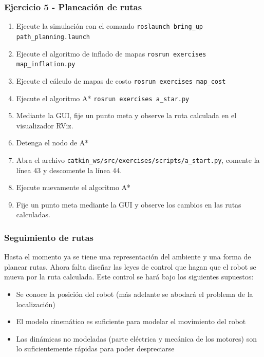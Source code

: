 \begin{frame}[containsverbatim]\frametitle{Ejercicio 5 - Planeación de rutas}
  \begin{enumerate}
  \item Ejecute la simulación con el comando \texttt{roslaunch bring\_up path\_planning.launch}
  \item Ejecute el algoritmo de inflado de mapas \texttt{rosrun exercises map\_inflation.py}
  \item Ejecute el cálculo de mapas de costo \texttt{rosrun exercises map\_cost}
  \item Ejecute el algoritmo A* \texttt{rosrun exercises a\_star.py}
  \item Mediante la GUI, fije un punto meta y observe la ruta calculada en el visualizador RViz.
  \item Detenga el nodo de A*
  \item Abra el archivo \texttt{catkin\_ws/src/exercises/scripts/a\_start.py}, comente la línea 43 y descomente la línea 44.
  \item Ejecute nuevamente el algoritmo A*
  \item Fije un punto meta mediante la GUI y observe los cambios en las rutas calculadas.
  \end{enumerate}
\end{frame}

\begin{frame}\frametitle{Seguimiento de rutas}
  Hasta el momento ya se tiene una representación del ambiente y una forma de planear rutas. Ahora falta diseñar las leyes de control que hagan que el robot se mueva por la ruta calculada. Este control se hará bajo los siguientes supuestos:
  \begin{itemize}
  \item Se conoce la posición del robot (más adelante se abodará el problema de la localización)
  \item El modelo cinemático es suficiente para modelar el movimiento del robot 
  \item Las dinámicas no modeladas (parte eléctrica y mecánica de los motores) son lo suficientemente rápidas para poder despreciarse
  \end{itemize}
\end{frame}

